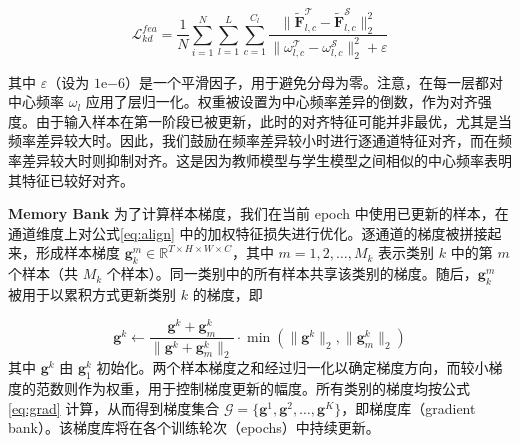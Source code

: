 \documentclass[10.5pt,letterpaper]{article}
\begin{document}
\begin{equation}
\mathcal{L}_{kd}^{fea} = \frac{1}{N} \sum_{i=1}^{N} \sum_{l=1}^{L} \sum_{c=1}^{C_l} \frac{\|\tilde{\textbf{F}}_{l,c}^{\mathcal{T}} - \tilde{\textbf{F}}_{l,c}^{\mathcal{S}}\|_2^2}{\|\omega_{l,c}^{\mathcal{T}} - \omega_{l,c}^{\mathcal{S}}\|_2^2 + \varepsilon}
\label{eq:align}
\end{equation}


其中 \(\varepsilon\)（设为 \(1\mathrm{e}{-6}\)）是一个平滑因子，用于避免分母为零。注意，在每一层都对中心频率 \(\omega_l\) 应用了层归一化。权重被设置为中心频率差异的倒数，作为对齐强度。由于输入样本在第一阶段已被更新，此时的对齐特征可能并非最优，尤其是当频率差异较大时。因此，我们鼓励在频率差异较小时进行逐通道特征对齐，而在频率差异较大时则抑制对齐。这是因为教师模型与学生模型之间相似的中心频率表明其特征已较好对齐。



%




\textbf{Memory Bank}
为了计算样本梯度，我们在当前 epoch 中使用已更新的样本，在通道维度上对公式\ref{eq:align} 中的加权特征损失进行优化。逐通道的梯度被拼接起来，形成样本梯度 \(\textbf{g}_{k}^{m} \in \mathbb{R}^{T \times H \times W \times C}\)，其中 \(m = 1, 2, \dots, M_k\) 表示类别 \(k\) 中的第 \(m\) 个样本（共 \(M_k\) 个样本）。同一类别中的所有样本共享该类别的梯度。随后，\(\textbf{g}_{k}^{m}\) 被用于以累积方式更新类别 \(k\) 的梯度，即


\begin{equation}
\textbf{g}^k \leftarrow \frac{\textbf{g}^k + \textbf{g}_m^k}{\|\textbf{g}^k + \textbf{g}_m^k\|_2} \cdot \min(\|\textbf{g}^k\|_2, \|\textbf{g}_m^k\|_2)
\label{eq:grad}
\end{equation}
其中 \(\textbf{g}^k\) 由 \(\textbf{g}_1^k\) 初始化。两个样本梯度之和经过归一化以确定梯度方向，而较小梯度的范数则作为权重，用于控制梯度更新的幅度。所有类别的梯度均按公式\ref{eq:grad} 计算，从而得到梯度集合 \(\mathcal{G} = \{\textbf{g}^1, \textbf{g}^2, \dots, \textbf{g}^K\}\)，即梯度库（gradient bank）。该梯度库将在各个训练轮次（epochs）中持续更新。
\end{document}
